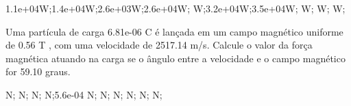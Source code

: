 \documentclass[12pt, addpoints]{exam}
\begin{document}
\begin{questions}
\begin{multicols*}{2}
\begin{oneparchoices}
\choice 1.1e+04W;\choice 1.4e+04W;\choice 2.6e+03W;\choice 2.6e+04W; W;\choice 3.2e+04W;\choice 3.5e+04W; W; W; W;\end{oneparchoices}
\question[20] Uma partícula de carga 6.81e-06 C é lançada em um campo magnético uniforme de    0.56 T , com uma velocidade de 2517.14 m/s. Calcule o valor da força magnética atuando na carga se o ângulo entre a velocidade e o campo magnético for   59.10 graus.

\begin{oneparchoices}
 N; N; N; N;\choice 5.6e-04 N; N; N; N; N; N;\end{oneparchoices}
\end{multicols*}
\end{questions}
\newpage
\end{document}
